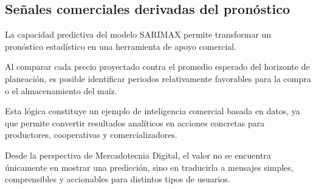 \documentclass[11pt]{article}
\begin{document}
    \hypertarget{seuxf1ales-comerciales-derivadas-del-pronuxf3stico}{%
\subsection{Señales comerciales derivadas del
pronóstico}\label{seuxf1ales-comerciales-derivadas-del-pronuxf3stico}}

La capacidad predictiva del modelo SARIMAX permite transformar un
pronóstico estadístico en una herramienta de apoyo comercial.

Al comparar cada precio proyectado contra el promedio esperado del
horizonte de planeación, es posible identificar periodos relativamente
favorables para la compra o el almacenamiento del maíz.

Esta lógica constituye un ejemplo de inteligencia comercial basada en
datos, ya que permite convertir resultados analíticos en acciones
concretas para productores, cooperativas y comercializadores.

Desde la perspectiva de Mercadotecnia Digital, el valor no se encuentra
únicamente en mostrar una predicción, sino en traducirla a mensajes
simples, comprensibles y accionables para distintos tipos de usuarios.
\end{document}
